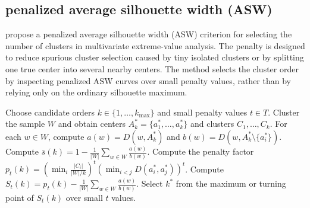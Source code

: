 \documentclass[a4paper]{article}
\begin{document}
        \subsection{penalized average silhouette width (ASW)}
            \cite{deng-2024-on-estimation-and-order-selection-for-multivariate-extremes-via-clustering} propose a penalized average silhouette width (ASW) criterion for selecting the number of clusters in multivariate extreme-value analysis.
            The penalty is designed to reduce spurious cluster selection caused by tiny isolated clusters or by splitting one true center into several nearby centers.
            The method selects the cluster order by inspecting penalized ASW curves over small penalty values, rather than by relying only on the ordinary silhouette maximum.
            \begin{algorithm}[H]
            \caption{Penalized ASW Order Selection}
            \begin{algorithmic}[1]
                \State Choose candidate orders \(k \in \{1,\dots,k_{\max}\}\) and small penalty values \(t \in T\).
                    \State Cluster the sample \(W\) and obtain centers \(A_k^\ast=\{a_1^\ast,\dots,a_k^\ast\}\) and clusters \(C_1,\dots,C_k\).
                    \State For each \(w \in W\), compute \(a(w)=D(w,A_k^\ast)\) and \(b(w)=D(w,A_k^\ast \setminus \{a_i^\ast\})\).
                    \State Compute \(\bar{s}(k)=1-\frac{1}{|W|}\sum_{w\in W}\frac{a(w)}{b(w)}\).
                    \State Compute the penalty factor \(p_t(k)=\left(\min_i \frac{|C_i|}{|W|/k}\right)^t\left(\min_{i<j}D(a_i^\ast,a_j^\ast)\right)^t\).
                    \State Compute \(S_t(k)=p_t(k)-\frac{1}{|W|}\sum_{w\in W}\frac{a(w)}{b(w)}\).
                \EndFor
                \State Select \(k^\ast\) from the maximum or turning point of \(S_t(k)\) over small \(t\) values.
            \end{algorithmic}
            \end{algorithm}
            
            
            
\end{document}
